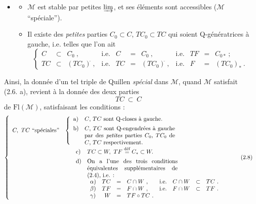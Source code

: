 \documentclass[11pt]{article}
\newcommand{\msp}[1]{\marginpar{\footnotesize [#1]}}
\newcommand{\M}{\mathcal{M}}
\newcommand{\Fl}{\mathrm{Fl}}
\begin{document}
\begin{itemize}[leftmargin=4em]
\item[(2.6)]
\begin{itemize}
\item[a)] $\M$ est stable par petites $\varinjlim$, et ses éléments sont accessibles ($\M$ “spéciale”).
\item[b)] Il existe des \textit{petites} parties $C_0 \subset C$, $TC_0 \subset TC$ qui soient Q-génératrices à gauche, i.e. telles que l'on ait
\[
\left\{
\begin{array}{rclcrclcrcl}
C & \subset & C_0^{\breve{}}\ , & \text{i.e.} & C & = & C_0^{\breve{}}\ , & \text{i.e.} & TF & = & C_{0*}\ ;\\
TC & \subset & (TC_0)^{\breve{}}\ , & \text{i.e.} & TC & = & (TC_0)^{\breve{}}\ , & \text{i.e.} & F & = & (TC_0)_*\ .
\end{array}\right. %
\]
\end{itemize}
\end{itemize}

Ainsi, la donnée d'un tel triple de Quillen \textit{spécial} dans $\M$, quand $\M$ satisfait (2.6. a), revient à la donnée des deux parties
\msp{page 15}
\[
TC \ \subset\ C
\tag*{(2.7)}
\]
de $\Fl(\M)$, satisfaisant les conditions :
\[
\left\{
\begin{array}{ll}
C,\ TC\ \text{“spéciales”} &
\left\{\begin{array}{ll}
\text{a)} & \text{$C$, $TC$ sont Q-closes à gauche.}\\[1ex]
\text{b)} & \parbox[t]{0.45\textwidth}{$C$, $TC$ sont Q-engendrées à gauche par des \textit{petites} parties $C_0$, $TC_0$ de $C$, $TC$ respectivement.}
\end{array}\right.\\[5ex]
 & \quad\ \begin{array}{ll}
\text{c)} & TC \subset W,\ TF \overset{\text{déf}}{=} C_* \subset W.\\[1ex]
\text{d)} & \parbox[t]{0.45\textwidth}{On a l'une des trois conditions équivalentes supplémentaires de (2.4), i.e. :}\\[5ex]
 & \begin{array}{lrcllrcl}
\alpha) & TC & = & C \cap W\ , & \text{i.e.} & C \cap W & \subset & TC\ .\\
\beta) & TF & = & F \cap W\ , & \text{i.e.} & F \cap W & \subset & TF\ .\\
\gamma) & W & = & TF \circ TC\ . & & & &
\end{array}
\end{array}
\end{array}\right.
\tag*{(2.8)}
\]
\end{document}
